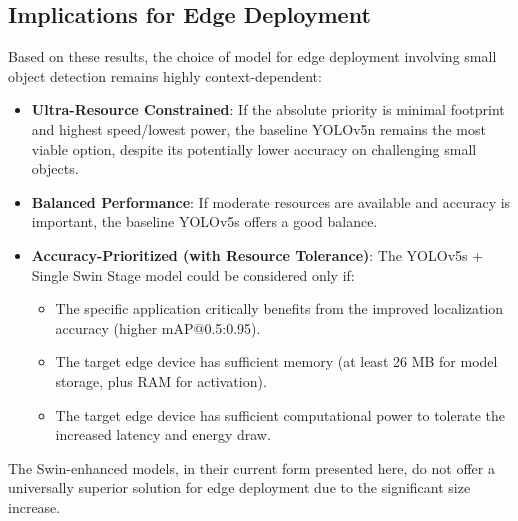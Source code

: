 \documentclass[conference]{IEEEtran}
\begin{document}
\subsection{ Implications for Edge Deployment}
Based on these results, the choice of model for edge deployment involving small object detection remains highly context-dependent:
\begin{itemize}
\item \textbf{Ultra-Resource Constrained}: If the absolute priority is minimal footprint and highest speed/lowest power, the baseline YOLOv5n remains the most viable option, despite its potentially lower accuracy on challenging small objects.
\item \textbf{Balanced Performance}: If moderate resources are available and accuracy is important, the baseline YOLOv5s offers a good balance.
\item \textbf{Accuracy-Prioritized (with Resource Tolerance)}: The YOLOv5s + Single Swin Stage model could be considered only if:
\begin{itemize}
\item The specific application critically benefits from the improved localization accuracy (higher mAP@0.5:0.95).
\item The target edge device has sufficient memory (at least 26 MB for model storage, plus RAM for activation).
\item The target edge device has sufficient computational power to tolerate the increased latency and energy draw.
\end{itemize}
\end{itemize}

The Swin-enhanced models, in their current form presented here, do not offer a universally superior solution for edge deployment due to the significant size increase.
\end{document}
